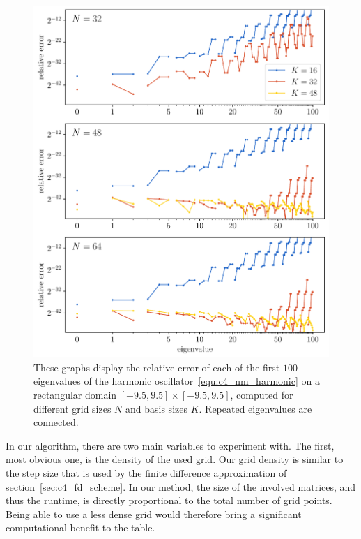 \begin{figure}
    \begin{center}
        \includegraphics[width=\textwidth]{img/chapter4/nm_test_harmonic.pdf}
    \end{center}
    \caption{These graphs display the relative error of each of the first $100$ eigenvalues of the harmonic oscillator~\eqref{equ:c4_nm_harmonic} on a rectangular domain $[-9.5,9.5]\times[-9.5, 9.5]$, computed for different grid sizes $N$ and basis sizes $K$. Repeated eigenvalues are connected.}
    \label{fig:c4_nm_harmonic_rectangle}
\end{figure}

In our algorithm, there are two main variables to experiment with. The first, most obvious one, is the density of the used grid. Our grid density is similar to the step size that is used by the finite difference approximation of section~\ref{sec:c4_fd_scheme}. In our method, the size of the involved matrices, and thus the runtime, is directly proportional to the total number of grid points. Being able to use a less dense grid would therefore bring a significant computational benefit to the table.

